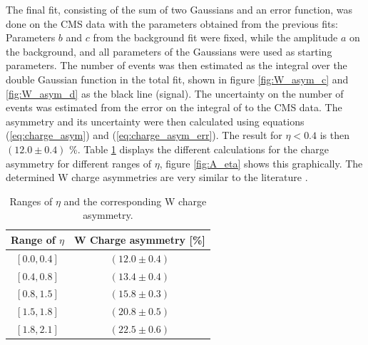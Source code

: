 \documentclass[%
 reprint,
 amsmath,amssymb,
 aps,
]{revtex4-2}
\begin{document}
The final fit, consisting of the sum of two Gaussians and an error function, was done on the CMS data with the parameters obtained from the previous fits: Parameters $b$ and $c$ from the background fit were fixed, while the amplitude $a$ on the background, and all parameters of the Gaussians were used as starting parameters. The number of events was then estimated as the integral over the double Gaussian function in the total fit, shown in figure \ref{fig:W_asym_c} and \ref{fig:W_asym_d} as the black line (signal). The uncertainty on the number of events was estimated from the error on the integral of to the CMS data. 
The asymmetry and its uncertainty were then calculated using equations (\ref{eq:charge_asym}) and (\ref{eq:charge_asym_err}). The result for $\eta < 0.4$ is then  $(12.0 \pm 0.4)$ \%. Table \ref{tab:asymmetry_etas} displays the different calculations for the charge asymmetry for different ranges of $\eta$, figure \ref{fig:A_eta} shows this graphically. 
The determined W charge asymmetries are very similar to the literature \cite{cms_collaboration_measurements_2020, saha_measurement_2013}.

\begin{table}
    \centering
    \begin{tabular}{|c|c|}
    \hline
    Range of $\eta$     & W Charge asymmetry [\%] \\
    \hline
    $[0.0, 0.4]$          & $(12.0 \pm 0.4)$ \\
    $[0.4, 0.8]$          & $(13.4 \pm 0.4)$ \\
    $[0.8, 1.5]$          & $(15.8 \pm 0.3)$ \\
    $[1.5, 1.8]$          & $(20.8 \pm 0.5)$ \\
    $[1.8, 2.1]$          & $(22.5 \pm 0.6)$ \\
    \hline
    \end{tabular}
    \caption{Ranges of $\eta$ and the corresponding W charge asymmetry.  }
    \label{tab:asymmetry_etas}
\end{table}
\end{document}
